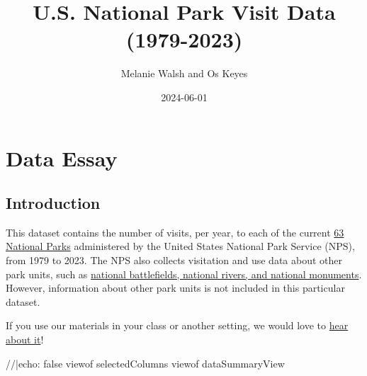 \documentclass[
  letterpaper,
  DIV=11,
  numbers=noendperiod]{scrartcl}
\title{U.S. National Park Visit Data (1979-2023)}
\author{Melanie Walsh and Os Keyes}
\date{2024-06-01}
\newenvironment{Shaded}{\begin{snugshade}}{\end{snugshade}}
\newcommand{\NormalTok}[1]{\textcolor[rgb]{0.00,0.23,0.31}{#1}}
\begin{document}
\maketitle


\section{Data Essay}

\subsection{Introduction}\label{introduction}

This dataset contains the number of visits, per year, to each of the
current
\href{https://en.wikipedia.org/wiki/List_of_national_parks_of_the_United_States\#National_parks}{63
National Parks} administered by the United States National Park Service
(NPS), from 1979 to 2023. The NPS also collects visitation and use data
about other park units, such as
\href{(https://www.nps.gov/aboutus/national-park-system.htm)}{national
battlefields, national rivers, and national monuments}. However,
information about other park units is not included in this particular
dataset.

\begin{tcolorbox}[enhanced jigsaw, title={Brief Survey}, opacityback=0, bottomtitle=1mm, left=2mm, coltitle=black, opacitybacktitle=0.6, breakable, arc=.35mm, colframe=quarto-callout-tip-color-frame, toprule=.15mm, rightrule=.15mm, colback=white, colbacktitle=quarto-callout-tip-color!10!white, leftrule=.75mm, toptitle=1mm, titlerule=0mm, bottomrule=.15mm]

If you use our materials in your class or another setting, we would love
to \href{https://forms.gle/yJpQscUH9k9Rn4Qy9}{hear about it}!

\end{tcolorbox}

\begin{tcolorbox}[enhanced jigsaw, title={View Summary of Columns}, opacityback=0, bottomtitle=1mm, left=2mm, coltitle=black, opacitybacktitle=0.6, breakable, arc=.35mm, colframe=quarto-callout-note-color-frame, toprule=.15mm, rightrule=.15mm, colback=white, colbacktitle=quarto-callout-note-color!10!white, leftrule=.75mm, toptitle=1mm, titlerule=0mm, bottomrule=.15mm]

\begin{Shaded}
\begin{Highlighting}[]
\NormalTok{//|echo: false}
\NormalTok{viewof selectedColumns}
\NormalTok{viewof dataSummaryView}
\end{Highlighting}
\end{Shaded}

\end{tcolorbox}
\end{document}
